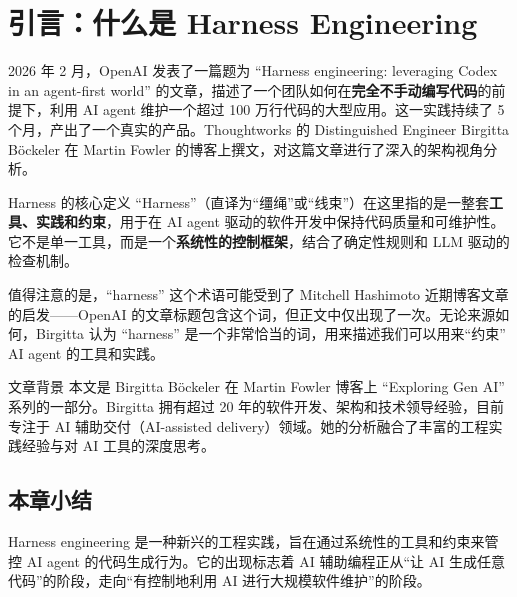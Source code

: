 \section{引言：什么是 Harness Engineering}

2026 年 2 月，OpenAI 发表了一篇题为 ``Harness engineering: leveraging Codex in an agent-first world'' 的文章，描述了一个团队如何在\textbf{完全不手动编写代码}的前提下，利用 AI agent 维护一个超过 100 万行代码的大型应用。这一实践持续了 5 个月，产出了一个真实的产品。Thoughtworks 的 Distinguished Engineer Birgitta B\"{o}ckeler 在 Martin Fowler 的博客上撰文，对这篇文章进行了深入的架构视角分析。

\begin{importantbox}{Harness 的核心定义}
``Harness''（直译为``缰绳''或``线束''）在这里指的是一整套\textbf{工具、实践和约束}，用于在 AI agent 驱动的软件开发中保持代码质量和可维护性。它不是单一工具，而是一个\textbf{系统性的控制框架}，结合了确定性规则和 LLM 驱动的检查机制。
\end{importantbox}

值得注意的是，``harness'' 这个术语可能受到了 Mitchell Hashimoto 近期博客文章的启发------OpenAI 的文章标题包含这个词，但正文中仅出现了一次。无论来源如何，Birgitta 认为 ``harness'' 是一个非常恰当的词，用来描述我们可以用来``约束'' AI agent 的工具和实践。

\begin{knowledgebox}{文章背景}
本文是 Birgitta B\"{o}ckeler 在 Martin Fowler 博客上 ``Exploring Gen AI'' 系列的一部分。Birgitta 拥有超过 20 年的软件开发、架构和技术领导经验，目前专注于 AI 辅助交付（AI-assisted delivery）领域。她的分析融合了丰富的工程实践经验与对 AI 工具的深度思考。
\end{knowledgebox}

\subsection{本章小结}

Harness engineering 是一种新兴的工程实践，旨在通过系统性的工具和约束来管控 AI agent 的代码生成行为。它的出现标志着 AI 辅助编程正从``让 AI 生成任意代码''的阶段，走向``有控制地利用 AI 进行大规模软件维护''的阶段。

\newpage

